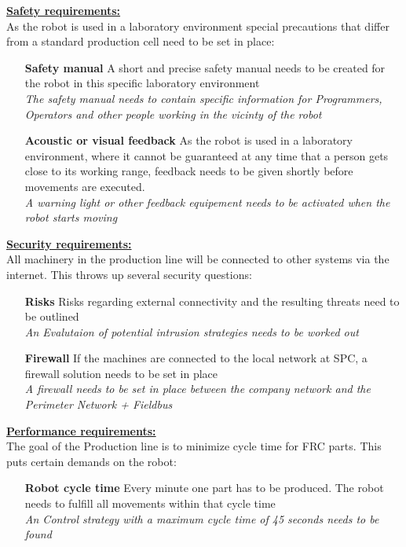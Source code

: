 %
\underline{\textbf{Safety requirements:}}\vspace{2mm}\\
As the robot is used in a laboratory environment special precautions that differ from a standard production cell need to be set in place:\\
\begin{itemize}[leftmargin=5cm]
	\item[\textbf{Safety manual}] A short and precise safety manual needs to be created for the robot in this specific laboratory environment\\
	\textit{The safety manual needs to contain specific information for Programmers, Operators and other people working in the vicinty of the robot }
	\item[\textbf{Acoustic or visual feedback}] As the robot is used in a laboratory environment, where it cannot be guaranteed at any time that a person gets close to its working range, feedback needs to be given shortly before movements are executed.	\\
	\textit{A warning light or other feedback equipement needs to be activated when the robot starts moving}
\end{itemize}
%
\underline{\textbf{Security requirements:}}\vspace{2mm}\\
All machinery in the production line will be connected to other systems via the internet. This throws up several security questions:\\
\begin{itemize}[leftmargin=5cm]
	\item[\textbf{Risks}] Risks regarding external connectivity and the resulting threats need to be outlined\\
	\textit{An Evalutaion of potential intrusion strategies needs to be worked out}
	\item[\textbf{Firewall}] If the machines are connected to the local network at SPC, a firewall solution needs to be set in place\\
	\textit{A firewall needs to be set in place between the company network and the Perimeter Network + Fieldbus}
\end{itemize}
%
\underline{\textbf{Performance requirements:}}\vspace{2mm}\\
The goal of the Production line is to minimize cycle time for FRC parts. This puts certain demands on the robot:\\
\begin{itemize}[leftmargin=5cm]
	\item[\textbf{Robot cycle time}] Every minute one part has to be produced. The robot needs to fulfill all movements within that cycle time\\
	\textit{An Control strategy with a maximum cycle time of 45 seconds needs to be found}
\end{itemize}

